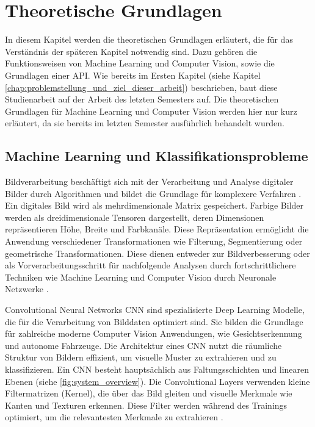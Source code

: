 \chapter{Theoretische Grundlagen} \label{chap:theoretische_grundlagen}  %

In diesem Kapitel werden die theoretischen Grundlagen erläutert, die für das Verständnis der späteren Kapitel notwendig sind. Dazu gehören die Funktionsweisen von Machine Learning und Computer Vision, sowie die Grundlagen einer API.
Wie bereits im Ersten Kapitel (siehe Kapitel \ref{chap:problemstellung_und_ziel_dieser_arbeit}) beschrieben, baut diese Studienarbeit auf der Arbeit des letzten Semesters auf. 
Die theoretischen Grundlagen für Machine Learning und Computer Vision werden hier nur kurz erläutert, da sie bereits im letzten Semester ausführlich behandelt wurden.



\section{Machine Learning und Klassifikationsprobleme} \label{sec:ml_cv}  %

Bildverarbeitung beschäftigt sich mit der Verarbeitung und Analyse digitaler Bilder durch Algorithmen und bildet die Grundlage für komplexere Verfahren \cite{kropatsch_einfuhrung_nodate}.
Ein digitales Bild wird als mehrdimensionale Matrix gespeichert. Farbige Bilder werden als dreidimensionale Tensoren 
dargestellt, deren Dimensionen repräsentieren Höhe, Breite und Farbkanäle. 
Diese Repräsentation ermöglicht die Anwendung verschiedener Transformationen wie Filterung, Segmentierung oder geometrische Transformationen. Diese dienen 
entweder zur Bildverbesserung oder als Vorverarbeitungsschritt für nachfolgende Analysen durch fortschrittlichere Techniken wie Machine Learning und Computer Vision durch Neuronale Netzwerke \cite{finbridgede_computer_2022}.

Convolutional Neural Networks \ac{CNN} sind spezialisierte Deep Learning Modelle, die für die Verarbeitung von Bilddaten optimiert sind. Sie bilden die Grundlage für zahlreiche moderne Computer Vision Anwendungen, wie Gesichtserkennung und autonome Fahrzeuge. 
Die Architektur eines CNN nutzt die räumliche Struktur von Bildern effizient, um visuelle Muster zu extrahieren und zu klassifizieren.
Ein CNN besteht hauptsächlich aus Faltungsschichten und linearen Ebenen (siehe \autoref{fig:system_overview}). 
Die Convolutional Layers verwenden kleine Filtermatrizen (Kernel), die über das Bild gleiten und visuelle Merkmale wie Kanten und Texturen erkennen. 
Diese Filter werden während des Trainings optimiert, um die relevantesten Merkmale zu extrahieren \cite{finbridgede_computer_2022} \cite{intel_convolutional_nodate}.

